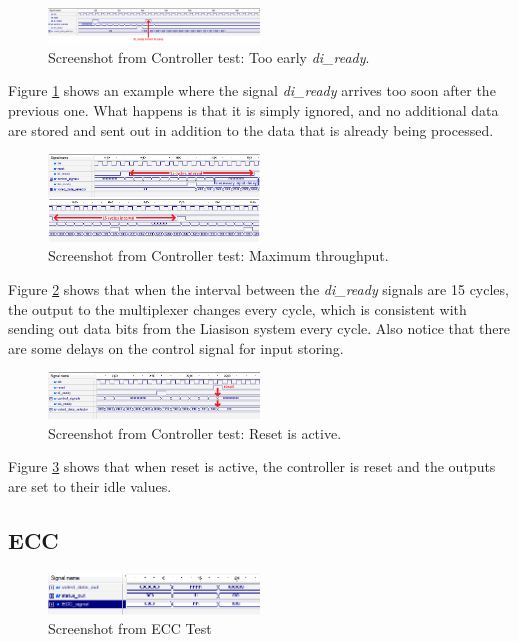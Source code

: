 \documentclass[a4paper]{IEEEtran}
\begin{document}
\begin{figure}[h!]
  \centering
      \includegraphics[width=0.5\textwidth]{Figures/Tests/ControllerTooEarlyDiReady}
  \caption{Screenshot from Controller test: Too early \textit{di\_ready}.}
  \label{fig:ControllerTooEarlyDiReady}
\end{figure}
Figure \ref{fig:ControllerTooEarlyDiReady} shows an example where the signal \textit{di\_ready} arrives too soon after the previous one.
What happens is that it is simply ignored, and no additional data are stored and sent out in addition to the data that is already being processed.

\begin{figure}[h!]
  \centering
      \includegraphics[width=0.5\textwidth]{Figures/Tests/ControllerThroughput}
  \caption{Screenshot from Controller test: Maximum throughput.}
  \label{fig:ControllerThroughput}
\end{figure}
Figure \ref{fig:ControllerThroughput} shows that when the interval between the \textit{di\_ready} signals are 15 cycles, the output to the multiplexer changes every cycle, which is consistent with sending out data bits from the Liasison system every cycle.
Also notice that there are some delays on the control signal for input storing.

\begin{figure}[h!]
  \centering
      \includegraphics[width=0.5\textwidth]{Figures/Tests/ControllerReset}
  \caption{Screenshot from Controller test: Reset is active.}
  \label{fig:ControllerReset}
\end{figure}
Figure \ref{fig:ControllerReset} shows that when reset is active, the controller is reset and the outputs are set to their idle values.

\subsection{ ECC }
\begin{figure}[h!]
  \centering
      \includegraphics[width=0.5\textwidth]{Figures/Tests/ECCTest}
  \caption{Screenshot from ECC Test}
  \label{fig:ECCTest}
\end{figure}
\end{document}
